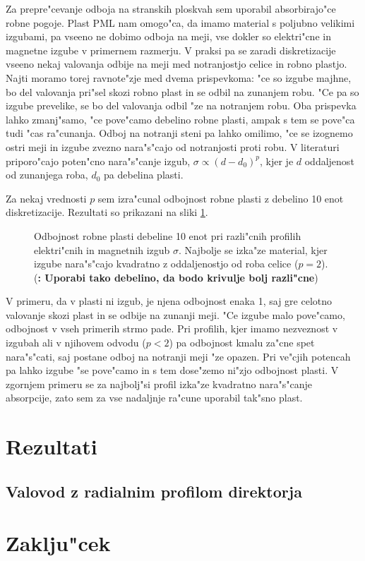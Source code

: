 \documentclass[a4paper,10pt]{article}
\newcommand{\todo}[1]{(\textbf{\textsmaller{TODO}: #1})}
\begin{document}
Za prepre"cevanje odboja na stranskih ploskvah sem uporabil absorbirajo"ce robne pogoje. 
Plast \acs{PML} nam omogo"ca, da imamo material s poljubno velikimi izgubami, pa vseeno ne dobimo odboja na meji, vse dokler so elektri"cne in magnetne izgube v primernem razmerju. 
V praksi pa se zaradi diskretizacije vseeno nekaj valovanja odbije na meji med notranjostjo celice in robno plastjo. 
Najti moramo torej ravnote"zje med dvema prispevkoma: "ce so izgube majhne, bo del valovanja pri"sel skozi robno plast in se odbil na zunanjem robu. 
"Ce pa so izgube prevelike, se bo del valovanja odbil "ze na notranjem robu. 
Oba prispevka lahko zmanj"samo, "ce pove"camo debelino robne plasti, ampak s tem se pove"ca tudi "cas ra"cunanja. 
Odboj na notranji steni pa lahko omilimo, "ce se izognemo ostri meji in izgube zvezno nara"s"cajo od notranjosti proti robu. 
V literaturi\cite{taflove} priporo"cajo poten"cno nara"s"canje izgub, $\sigma \propto (d-d_0)^{p}$, kjer je $d$ oddaljenost od zunanjega roba, $d_0$ pa debelina plasti. 

Za nekaj vrednosti $p$ sem izra"cunal odbojnost robne plasti z debelino 10 enot diskretizacije. Rezultati so prikazani na sliki \ref{fig:test-absorption}. 

\begin{figure}[h]
 
 \caption{Odbojnost robne plasti debeline 10 enot pri razli"cnih profilih elektri"cnih in magnetnih izgub $\sigma$. Najbolje se izka"ze material, kjer izgube nara"s"cajo kvadratno z oddaljenostjo od roba celice ($p=2$). 
 \todo{Uporabi tako debelino, da bodo krivulje bolj razli"cne}
 }
 \label{fig:test-absorption}
\end{figure}

V primeru, da v plasti ni izgub, je njena odbojnost enaka 1, saj gre celotno valovanje skozi plast in se odbije na zunanji meji. 
"Ce izgube malo pove"camo, odbojnost v vseh primerih strmo pade. 
Pri profilih, kjer imamo nezveznost v izgubah ali v njihovem odvodu ($p<2$) pa odbojnost kmalu za"cne spet nara"s"cati, saj postane odboj na notranji meji "ze opazen.
Pri ve"cjih potencah pa lahko izgube "se pove"camo in s tem dose"zemo ni"zjo odbojnost plasti. 
V zgornjem primeru se za najbolj"si profil izka"ze kvadratno nara"s"canje absorpcije, zato sem za vse nadaljnje ra"cune uporabil tak"sno plast. 

\section{Rezultati}

\subsection{Valovod z radialnim profilom direktorja}



\section{Zaklju"cek}

\newpage


\end{document}
